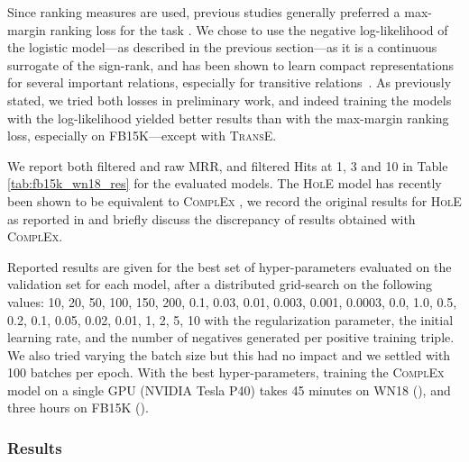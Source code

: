 \documentclass[twoside,11pt]{article}
\renewcommand{\cite}{\citep}
\begin{document}
Since ranking measures are used, previous studies generally preferred a max-margin ranking loss for the task \cite{bordes2013translating,nickel_2016_holographic}. We chose to use the negative log-likelihood of the logistic model---as described in the previous section---as it is a continuous surrogate of the sign-rank, and has been shown to learn compact representations for several important relations, especially for transitive relations~\cite{bouchard2015approximate}. As previously stated, we tried both losses in preliminary work, and indeed training the models with the log-likelihood yielded better results than with the max-margin ranking loss, especially on FB15K---except with \textsc{TransE}.


We report both filtered and raw MRR, and filtered Hits at 1, 3 and 10 in Table \ref{tab:fb15k_wn18_res} for the evaluated models.
The \textsc{HolE} model has recently been shown to be equivalent to \textsc{ComplEx} \cite{hayashi2017equivalence}, we record the original results for \textsc{HolE} as reported in \citet{nickel_2016_holographic} and briefly discuss the discrepancy of results
obtained with \textsc{ComplEx}. 


Reported results are given for the best set of hyper-parameters evaluated on the validation set for each model, after a distributed grid-search on the following values: 10, 20, 50, 100, 150, 200, 0.1, 0.03, 0.01, 0.003, 0.001, 0.0003, 0.0, 1.0, 0.5, 0.2, 0.1, 0.05, 0.02, 0.01,  1, 2, 5, 10 with  the  regularization parameter,  the initial learning rate, and  the number of negatives generated per positive training triple. We also tried varying the batch size but this had no impact and we settled with 100 batches per epoch. 
With the best hyper-parameters, training the \textsc{ComplEx} model on a single GPU (NVIDIA Tesla P40) takes 45 minutes on WN18 (), and three hours on FB15K ().

\subsubsection{Results}
\label{sec:fb15k_res}
\end{document}
